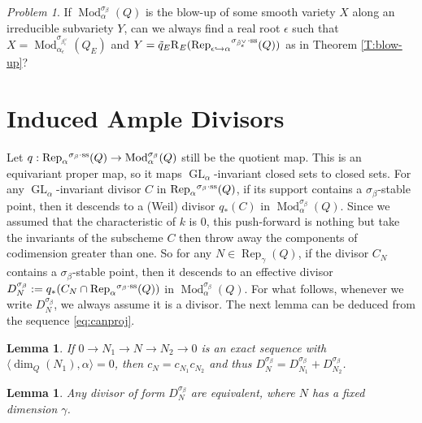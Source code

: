 \documentclass{amsart}
\newtheorem{lemma}[theorem]{Lemma}
\theoremstyle{definition}
\theoremstyle{remark}
\newtheorem{problem}[theorem]{Problem}
\numberwithin{equation}{section}
\begin{document}
\begin{problem} If ${\operatorname{Mod}}_\alpha^{\sigma_\beta}(Q)$ is the blow-up of some smooth variety $X$ along an irreducible subvariety $Y$, can we always find a real root $\epsilon$ such that $X={\operatorname{Mod}}_{\alpha_\epsilon}^{\sigma_{\beta_\epsilon^\vee}}(Q_E)$ and $Y=\tilde{q}_E{\operatorname{R}}_E({\operatorname{Rep}}_{\epsilon\hookrightarrow\alpha}{^{\sigma_{{\tilde{\beta}_\epsilon^\vee}}\cdot{\rm {ss}}}}(Q))$ as in Theorem \ref{T:blow-up}?
\end{problem}

\section{Induced Ample Divisors} \label{S:IAD}

Let $q:{\operatorname{Rep}}_\alpha{^{\sigma_{{\beta}}\cdot{\rm {ss}}}}(Q)\to{\operatorname{Mod}}_\alpha^{\sigma_\beta}(Q)$ still be the quotient map. This is an equivariant proper map, so it maps ${\operatorname{GL}}_\alpha$-invariant closed sets to closed sets. For any ${\operatorname{GL}}_\alpha$-invariant divisor $C$ in ${\operatorname{Rep}}_\alpha{^{\sigma_{{\beta}}\cdot{\rm {ss}}}}(Q)$, if its support contains a $\sigma_\beta$-stable point, then it descends to a (Weil) divisor $q_*(C)$ in ${\operatorname{Mod}}_\alpha^{\sigma_\beta}(Q)$. Since we assumed that the characteristic of $k$ is $0$, this push-forward is nothing but take the invariants of the subscheme $C$ then throw away the components of codimension greater than one.
So for any $N\in{\operatorname{Rep}}_\gamma(Q)$, if the divisor $C_N$ contains a $\sigma_\beta$-stable point, then it descends to an effective divisor $D_N^{\sigma_\beta}:=q_*(C_N\cap{\operatorname{Rep}}_\alpha{^{\sigma_{{\beta}}\cdot{\rm {ss}}}}(Q))$ in ${\operatorname{Mod}}_\alpha^{\sigma_\beta}(Q)$. For what follows, whenever we write $D_N^{\sigma_\beta}$, we always assume it is a divisor. The next lemma can be deduced from the sequence \eqref{eq:canproj}.

\begin{lemma} \cite[Lemma 1]{DW1} \label{L:Dplus}
If $0\to N_1\to N\to N_2\to 0$ is an exact sequence with ${\langle{\dim_Q(N_1),\alpha}\rangle}=0$, then $c_N=c_{N_1}c_{N_2}$ and thus $D_N^{\sigma_\beta}=D_{N_1}^{\sigma_\beta}+D_{N_2}^{\sigma_\beta}$.
\end{lemma}

\begin{lemma} \label{L:Dequi}
Any divisor of form $D_N^{\sigma_\beta}$ are equivalent, where $N$ has a fixed dimension $\gamma$.
\end{lemma}
\end{document}

